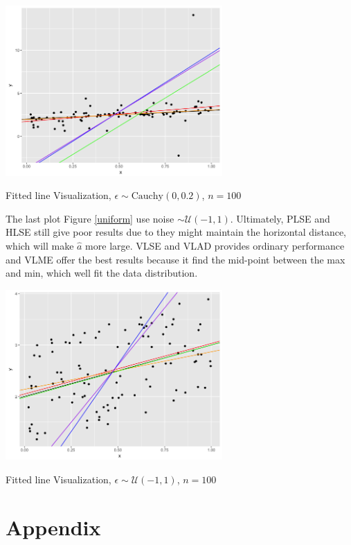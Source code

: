 \documentclass[twoside]{article}
\begin{document}
\begin{center}
\makeatletter
\def\@captype{figure}
\makeatother
\includegraphics [height=6.5cm]{code/sca/sca+cauchy.png}
\caption{Fitted line Visualization, $\epsilon \sim \mathrm{Cauchy}(0,0.2)$, $n=100$}
\label{cauchy}
\end{center}

The last plot Figure \ref{uniform} use noise $\sim \mathcal{U}(-1,1)$. Ultimately, PLSE and HLSE still give poor results due to they might maintain the horizontal distance, which will make $\hat{a}$ more large. VLSE and VLAD provides ordinary performance and VLME offer the best results because it find the mid-point between the max and min, which well fit the data distribution.

\begin{center}
\makeatletter
\def\@captype{figure}
\makeatother
\includegraphics [height=6.5cm]{code/sca/sca+uniform.png}
\caption{Fitted line Visualization, $\epsilon \sim \mathcal{U}(-1,1)$, $n=100$}
\label{uniform}
\end{center}

\section{Appendix}
\end{document}
